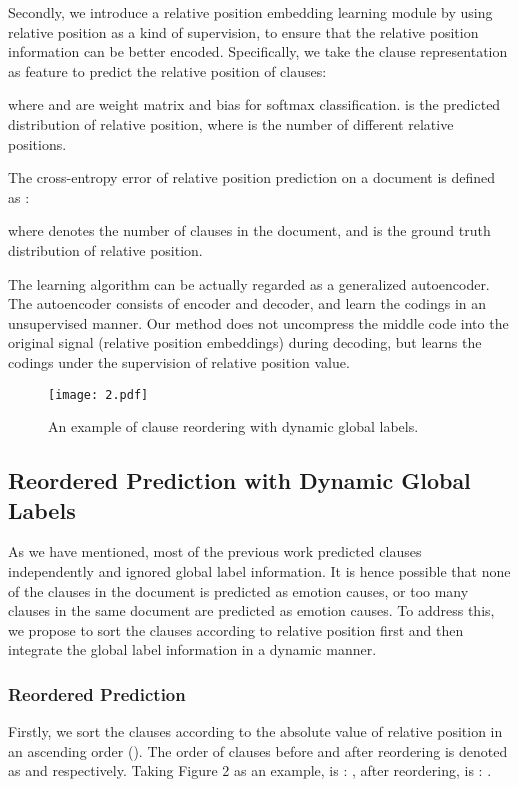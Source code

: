 \documentclass[letterpaper]{article} \usepackage{aaai19}  \usepackage{times}  \usepackage{helvet}  \usepackage{courier}  \usepackage{url}  \usepackage{graphicx}  \frenchspacing  \setlength{\pdfpagewidth}{8.5in}  \setlength{\pdfpageheight}{11in}  \setcounter{secnumdepth}{0}
\begin{document}
Secondly, we introduce a relative position embedding learning module by using relative position as a kind of supervision, to ensure that the relative position information can be better encoded. Specifically, we take the clause representation  as feature to predict the relative position of clauses:

where  and  are weight matrix and bias for softmax classification.  is the predicted distribution of relative position, where  is the number of different relative positions.

The cross-entropy error of relative position prediction on a document is defined as :

where  denotes the number of clauses in the document, and  is the ground truth distribution of relative position.

The learning algorithm can be actually regarded as a generalized autoencoder. The autoencoder consists of encoder and decoder, and learn the codings in an unsupervised manner. Our method does not uncompress the middle code into the original signal (relative position embeddings) during decoding, but learns the codings under the supervision of relative position value.


\begin{figure*}[!t]
	
	\centering
	\texttt{[image: 2.pdf]}
	\caption{\label{font-table} An example of clause reordering with dynamic global labels.}
	\label{fig_sim2}
\end{figure*}

\subsection{Reordered Prediction with Dynamic Global Labels}

As we have mentioned, most of the previous work predicted clauses independently and ignored global label information. It is hence possible that none of the clauses in the document is predicted as emotion causes, or too many clauses in the same document are predicted as emotion causes. To address this, we propose to sort the clauses according to relative position first and then integrate the global label information in a dynamic manner.


\subsubsection{Reordered Prediction}

Firstly, we sort the clauses according to the absolute value of relative position in an ascending order (). The order of clauses before and after reordering is denoted as  and  respectively. Taking Figure 2 as an example,  is : , after reordering,  is : .
\end{document}
